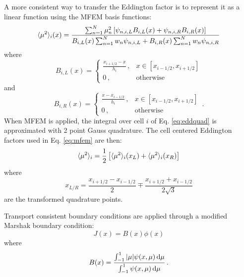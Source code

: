 A more consistent way to transfer the Eddington factor is to represent it as a linear function using the MFEM basis functions:
	\begin{equation} \label{eq:eddquad}
		\langle \mu^2 \rangle_i(x) = \frac{
			\sum_{n=1}^N \mu_n^2 \left[\psi_{n,i,L}B_{i,L}(x) + \psi_{n,i,R} B_{i,R}(x)\right]
		}
		{
			B_{i,L}(x) \sum_{n=1}^N w_n \psi_{n,i,L} + B_{i,R}(x) \sum_{n=1}^N w_n \psi_{n,i,R} 
		}
	\end{equation}
where 
	\begin{equation}
		B_{i,L}(x) = \begin{cases}
			\frac{x_{i+1/2} - x}{h_i} \,, & x \in [x_{i-1/2}, x_{i+1/2}] \\ 
			0 \,, & \text{otherwise}
		\end{cases}
	\end{equation}
and 
	\begin{equation}
		B_{i,R}(x) = \begin{cases}
			\frac{x - x_{i-1/2}}{h_i} \,, & x \in [x_{i-1/2}, x_{i+1/2}] \\ 
			0 \,, & \text{otherwise}
		\end{cases} \,.
	\end{equation}
When MFEM is applied, the integral over cell $i$ of Eq. \ref{eq:eddquad} is approximated with 2 point Gauss quadrature. The cell centered Eddington factors used in Eq. \ref{eq:mfem} are then: 
	\begin{equation} 
		\langle \mu^2 \rangle_i = \frac{1}{2} \left[ \langle \mu^2 \rangle_i(x_L) + \langle \mu^2 \rangle_i(x_R) \right]
	\end{equation}
where 
	\begin{equation}
		x_{L/R} = \frac{x_{i+1/2} - x_{i-1/2}}{2} \mp \frac{x_{i+1/2} + x_{i-1/2}}{2\sqrt{3}}
	\end{equation}
are the transformed quadrature points. 

Transport consistent boundary conditions are applied through a modified Marshak boundary condition: 
	\begin{equation} 
		J(x) = B(x) \phi(x) 
	\end{equation} 
where 
	\begin{equation} 
		B(x) = \frac{\int_{-1}^1 |\mu| \psi(x, \mu) \mathop{}\!\mathrm{d} \mu}
		{\int_{-1}^1 \psi(x, \mu) \mathop{}\!\mathrm{d} \mu} \,. 
	\end{equation}

